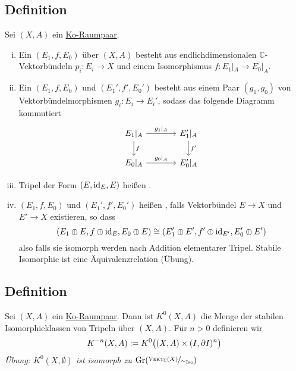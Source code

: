 \subsection[Definition: Tripel, Morphismus von Tripeln und stabile Isomorphie]{Definition} %
\label{sub:31}
Sei $(X,A)$ ein \hyperref[def_koraumpaar]{Ko-Raumpaar}.
\begin{enumerate}[(i)]
	\item Ein  $(E_1,f,E_0)$ über $(X,A)$ besteht aus endlichdimensionalen $\mathds{C}$-Vektorbündeln $p_i \colon E_i \to X$ und einem Isomorphismus
	$f \colon E_1|_A \to E_0|_A$.
	\item Ein  $(E_1,f,E_0)$ und $(E_1',f',E_0')$ besteht aus einem Paar $(g_1,g_0)$ von Vektorbündelmorphismen $g_i \colon E_i \to E_i'$,
	sodass das folgende Diagramm kommutiert
	\[
		\begin{tikzcd}[column sep=large]
			E_1|_A \rar["g_1|_A"] \dar["f"]& E_1'|_A \dar["f'"]\\
			E_0|_A \rar["g_0|_A"] & E_0'|_A
		\end{tikzcd}
	\] 
	\item Tripel der Form $(E,\id_E,E)$ heißen .
	\item $(E_1,f,E_0)$ und $(E_1',f',E_0')$ heißen , falls Vektorbündel $E \to X$ und $E' \to X$ existieren, so dass
	\[
		\enbrace*{E_1 \oplus E, f \oplus \id_E, E_0 \oplus E} \cong \enbrace*{E_1' \oplus E', f' \oplus \id_{E'}, E_0' \oplus E' } 
	\]
	also falls sie isomorph werden nach Addition elementarer Tripel.
	Stabile Isomorphie ist eine Äquivalenzrelation (Übung). 
\end{enumerate}

\subsection[Definition von $K^{-n}(X,A)$]{Definition} %
\label{sub:32}
Sei $(X,A)$ ein \hyperref[def_koraumpaar]{Ko-Raumpaar}. Dann ist $K^0(X,A)$ die Menge der stabilen Isomorphieklassen von Tripeln über $(X,A)$. Für $n>0$ definieren wir 
\[
	K^{-n}(X,A) := K^0 \enbrace[\big]{(X,A) \times (I,\partial I)^n} 
\]
\emph{Übung: $K^0(X,\emptyset)$ ist isomorph zu $\Gr \enbrace*{\nicefrac{\VEKT_\mathds{C}(X)}{\sim_{\Iso}}}$}

